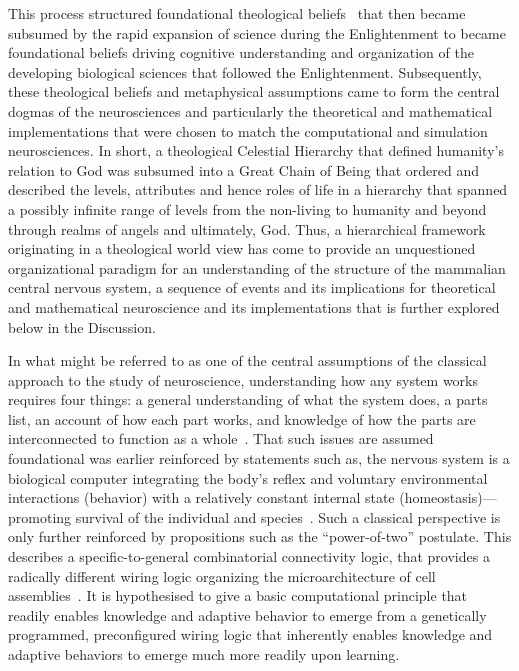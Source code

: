 \documentclass[11pt,3p,twocolumn]{JMN}
\begin{document}
This process structured foundational theological beliefs~\citep{lovejoy48} that then became subsumed by the rapid expansion of science during the Enlightenment to became foundational beliefs driving cognitive understanding and organization of the developing biological sciences that followed the Enlightenment. Subsequently, these theological beliefs and metaphysical assumptions came to form the central dogmas of the neurosciences and particularly the theoretical and mathematical implementations that were chosen to match the computational and simulation neurosciences. In short, a theological Celestial Hierarchy that defined humanity's relation to God was subsumed into a Great Chain of Being that ordered and described the levels, attributes and hence roles of life in a hierarchy that spanned a possibly infinite range of levels from the non-living to humanity and beyond through realms of angels and ultimately, God. Thus, a hierarchical framework originating in a theological world view has come to provide an unquestioned organizational paradigm for an understanding of the structure of the mammalian central nervous system, a sequence of events and its implications for theoretical and mathematical neuroscience and its implementations that is further explored below in the Discussion.

In what might be referred to as one of the central assumptions of the classical approach to the study of neuroscience, understanding how any system works requires four things: a general understanding of what the system does, a parts list, an account of how each part works, and knowledge of how the parts are interconnected to function as a whole~\cite[see][]{swanson15}. That such issues are assumed foundational was earlier reinforced by statements such as, the nervous system is a biological computer integrating the body’s reflex and voluntary environmental interactions (behavior) with a relatively constant internal state (homeostasis)—promoting survival of the individual and species~\citep{swanson10}. Such a classical perspective is only further reinforced by propositions such as the ``power-of-two'' postulate. This describes a specific-to-general combinatorial connectivity logic, that provides a radically different wiring logic organizing the microarchitecture of cell assemblies~\citep{tsien15}. It is hypothesised to give a basic computational principle that readily enables knowledge and adaptive behavior to emerge from a genetically programmed, preconfigured wiring logic that inherently enables knowledge and adaptive behaviors to emerge much more readily upon learning.
\end{document}
